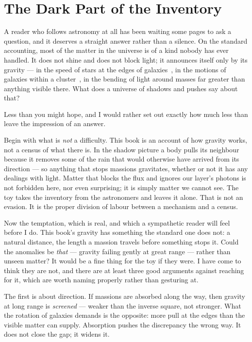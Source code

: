\documentclass[fontsize=11pt,paper=a4,pagesize=auto,parskip=half-]{scrbook}
\begin{document}
\section{The Dark Part of the Inventory}

A reader who follows astronomy at all has been waiting some pages to ask a question, and it deserves a straight answer rather than a silence. On the standard accounting, most of the matter in the universe is of a kind nobody has ever handled. It does not shine and does not block light; it announces itself only by its gravity --- in the speed of stars at the edges of galaxies~\cite{rubin1980}, in the motions of galaxies within a cluster~\cite{zwicky1933}, in the bending of light around masses far greater than anything visible there. What does a universe of shadows and pushes say about that?

Less than you might hope, and I would rather set out exactly how much less than leave the impression of an answer.

Begin with what is \emph{not} a difficulty. This book is an account of how gravity works, not a census of what there is. In the shadow picture a body pulls its neighbour because it removes some of the rain that would otherwise have arrived from its direction --- so anything that stops massions gravitates, whether or not it has any dealings with light. Matter that blocks the flux and ignores our layer's photons is not forbidden here, nor even surprising; it is simply matter we cannot see. The toy takes the inventory from the astronomers and leaves it alone. That is not an evasion. It is the proper division of labour between a mechanism and a census.

Now the temptation, which is real, and which a sympathetic reader will feel before I do. This book's gravity has something the standard one does not: a natural distance, the length a massion travels before something stops it. Could the anomalies be \emph{that} --- gravity failing gently at great range --- rather than unseen matter? It would be a fine thing for the toy if they were. I have come to think they are not, and there are at least three good arguments against reaching for it, which are worth naming properly rather than gesturing at.

The first is about direction. If massions are absorbed along the way, then gravity at long range is \emph{screened} --- weaker than the inverse square, not stronger. What the rotation of galaxies demands is the opposite: more pull at the edges than the visible matter can supply. Absorption pushes the discrepancy the wrong way. It does not close the gap; it widens it.
\end{document}
